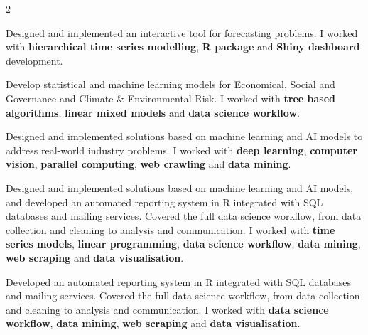 \documentclass[10pt,a4paper,withhyper]{altacv}
\begin{document}
\begin{paracol}{2}


Designed and implemented an interactive tool for forecasting problems. I worked with \textbf{hierarchical time series modelling}, \textbf{R package} and \textbf{Shiny dashboard} development.

\divider

Develop statistical and machine learning models for Economical, Social and Governance and Climate \& Environmental Risk. I worked with \textbf{tree based algorithms}, \textbf{linear mixed models} and \textbf{data science workflow}.

\divider

Designed and implemented solutions based on machine learning and AI models to address real-world industry problems. I worked with \textbf{deep learning}, \textbf{computer vision}, \textbf{parallel computing}, \textbf{web crawling} and \textbf{data mining}.

\divider

Designed and implemented solutions based on machine learning and AI models, and developed an automated reporting system in R integrated with SQL databases and mailing services. Covered the full data science workflow, from data collection and cleaning to analysis and communication. I worked with \textbf{time series models}, \textbf{linear programming}, \textbf{data science workflow}, \textbf{data mining}, \textbf{web scraping} and \textbf{data visualisation}.

\divider

Developed an automated reporting system in R integrated with SQL databases and mailing services. Covered the full data science workflow, from data collection and cleaning to analysis and communication. I worked with \textbf{data science workflow}, \textbf{data mining}, \textbf{web scraping} and \textbf{data visualisation}.


\end{paracol}
\end{document}
